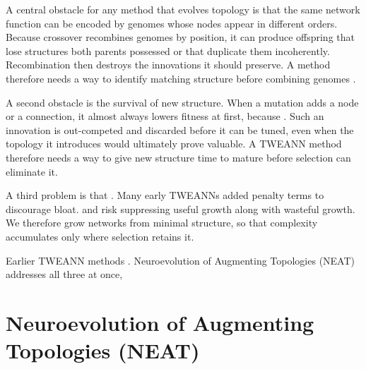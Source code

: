 A central obstacle for any method that evolves topology is that the same network function can be encoded by genomes whose nodes appear in different orders.
Because crossover recombines genomes by position, it can produce offspring that lose structures both parents possessed or that duplicate them incoherently.
Recombination then destroys the innovations it should preserve.
A method therefore needs a way to identify matching structure before combining genomes \parencite{stanley_evolving_2002}.

A second obstacle is the survival of new structure.
When a mutation adds a node or a connection, it almost always lowers fitness at first, because  .
Such an innovation is out-competed and discarded before it can be tuned, even when the topology it introduces would ultimately prove valuable.
A TWEANN method therefore needs a way to give new structure time to mature before selection can eliminate it.

A third problem is that .
Many early TWEANNs added penalty terms to discourage bloat.
 and risk suppressing useful growth along with wasteful growth.
We therefore grow networks from minimal structure, so that complexity accumulates only where selection retains it.

Earlier TWEANN methods .
Neuroevolution of Augmenting Topologies (NEAT) \parencite{stanley_evolving_2002} addresses all three at once, 


\section{Neuroevolution of Augmenting Topologies (NEAT)}
\label{subsec:neuroevolution-of-augmenting-topologies-neat}

